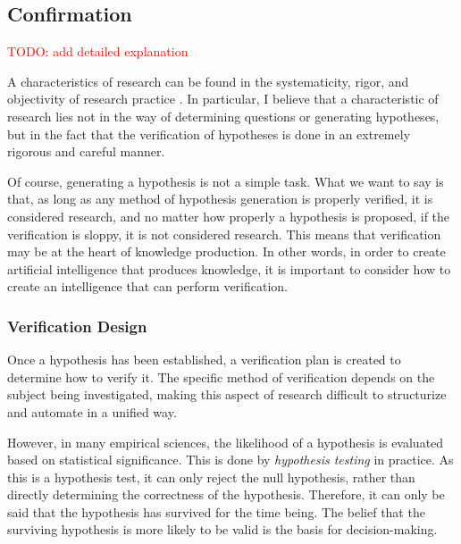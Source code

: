 \documentclass{book}
\begin{document}
\subsection{Confirmation}

\textcolor{red}{TODO: add detailed explanation}

A characteristics of research can be found in the systematicity, rigor, and objectivity of research practice \cite{sep-scientific-method,hoyningen2008systematicity,haack2003defending}. In particular, I believe that a characteristic of research lies not in the way of determining questions or generating hypotheses, but in the fact that the verification of hypotheses is done in an extremely rigorous and careful manner. 


Of course, generating a hypothesis is not a simple task. What we want to say is that, as long as any method of hypothesis generation is properly verified, it is considered research, and no matter how properly a hypothesis is proposed, if the verification is sloppy, it is not considered research. This means that verification may be at the heart of knowledge production. In other words, in order to create artificial intelligence that produces knowledge, it is important to consider how to create an intelligence that can perform verification.

\subsubsection{Verification Design}
Once a hypothesis has been established, a verification plan is created to determine how to verify it. The specific method of verification depends on the subject being investigated, making this aspect of research difficult to structurize and automate in a unified way.

However, in many empirical sciences, the likelihood of a hypothesis is evaluated based on statistical significance. This is done by \textit{hypothesis testing} in practice. As this is a hypothesis test, it can only reject the null hypothesis, rather than directly determining the correctness of the hypothesis. Therefore, it can only be said that the hypothesis has survived for the time being. The belief that the surviving hypothesis is more likely to be valid is the basis for decision-making.
\end{document}
